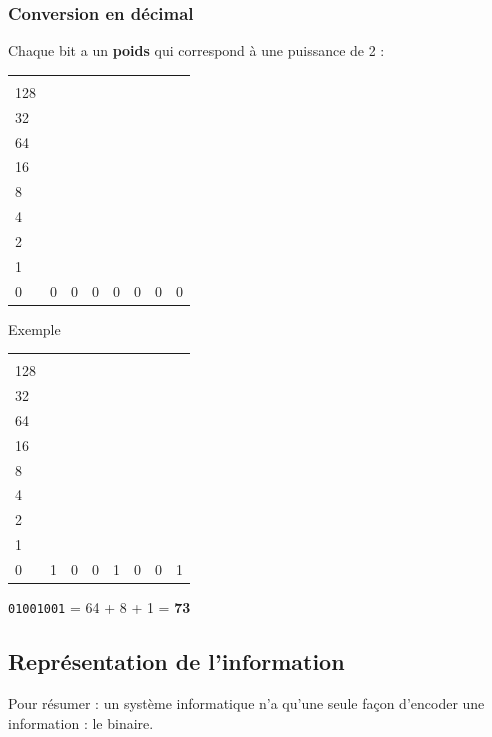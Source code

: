 \subsubsection{Conversion en décimal}
Chaque bit a un \textbf{poids} qui correspond à une puissance de 2 :

\begin{center}
	\begin{tabular}{|l|l|l|l|l|l|l|l|}
		\hline
		\makecell[tl]{$2^{7}$         \\ 128} & \makecell[tl]{$2^{6}$\\  32} & \makecell[tl]{$2^{5}$\\ 64} & \makecell[tl]{$2^{4}$\\ 16} & \makecell[tl]{$2^{3}$\\ 8} & \makecell[tl]{$2^{2}$ \\ 4} & \makecell[tl]{$2^{1}$\\ 2} & \makecell[tl]{$2^{0}$ \\1} \\
		\hline
		0 & 0 & 0 & 0 & 0 & 0 & 0 & 0 \\
		\hline
	\end{tabular}
\end{center}
\begin{UPSTIexemples}{Exemple}
	\begin{center}
		\begin{tabular}{|l|l|l|l|l|l|l|l|}
			\hline
			\makecell[tl]{$2^{7}$         \\ 128} & \makecell[tl]{$2^{6}$\\  32} & \makecell[tl]{$2^{5}$\\ 64} & \makecell[tl]{$2^{4}$\\ 16} & \makecell[tl]{$2^{3}$\\ 8} & \makecell[tl]{$2^{2}$ \\ 4} & \makecell[tl]{$2^{1}$\\ 2} & \makecell[tl]{$2^{0}$ \\1} \\
			\hline
			0 & 1 & 0 & 0 & 1 & 0 & 0 & 1 \\
			\hline
		\end{tabular}
	\end{center}
	\texttt{01001001} = 64 + 8 + 1 = \textbf{73}
\end{UPSTIexemples}

\subsection{Représentation de l’information}
Pour résumer : un système informatique n'a qu'une seule façon d'encoder une information : le binaire.

